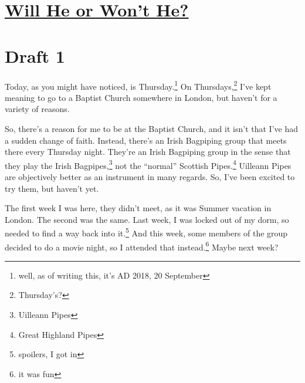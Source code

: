 \documentclass[a4paper]{article}
\newcommand{\say}[1]{``#1''}
\newcommand{\1}{\={a}}
\newcommand{\2}{\={e}}
\newcommand{\3}{\={\i}}
\newcommand{\4}{\=o}
\newcommand{\5}{\=u}
\newcommand{\6}{\={A}}
\newcommand{\<}{\textless}
\renewcommand{\>}{\textgreater}
\renewcommand{\,}{\textsuperscript{,}}
\begin{document}
\doublespacing
\section{\href{will-he-or-wont-he.html}{Will He or Won't He?}}
\section{Draft 1}
Today, as you might have noticed, is Thursday.\footnote{well, as of writing this, it's AD 2018, 20 September}
On Thursdays,\footnote{Thursday's?} I've kept meaning to go to a Baptist Church somewhere in London, but haven't for a variety of reasons.

So, there's a reason for me to be at the Baptist Church, and it isn't that I've had a sudden change of faith.
Instead, there's an Irish Bagpiping group that meets there every Thursday night.
They're an Irish Bagpiping group in the sense that they play the Irish Bagpipes,\footnote{Uilleann Pipes} not the \say{normal} Scottish Pipes.\footnote{Great Highland Pipes}
Uilleann Pipes are objectively better as an instrument in many regards.
So, I've been excited to try them, but haven't yet.

The first week I was here, they didn't meet, as it was Summer vacation in London.
The second was the same.
Last week, I was locked out of my dorm, so needed to find a way back into it.\footnote{spoilers, I got in}
And this week, some members of the group decided to do a movie night, so I attended that instead.\footnote{it was fun}
Maybe next week?
\end{document}
